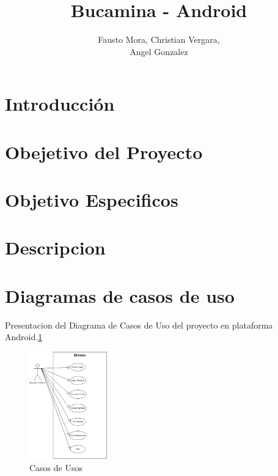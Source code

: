 \documentclass[11pt]{article} %
\title{Bucamina - Android}
\author{Fausto Mora, Christian Vergara, \\ Angel Gonzalez}
\begin{document}

\maketitle

\section{Introducción}
\newcommand{\oops}[1]{\textit{#1}}

\section{Obejetivo del Proyecto}
\section{Objetivo Especificos}
\section{Descripcion}
\section{Diagramas de casos de uso }

\begin{center}
Presentacion del Diagrama de Casos de Uso del proyecto en plataforma Android.\ref{fig:casosdeusos}

	\begin{figure}[h!]
  		\centering
    		\includegraphics[width=0.3\textwidth]{imagenes/casosdeusos.png}
  		\caption{Casos de Usos}
		\label{fig:casosdeusos}
	\end{figure}
\end{center}
\end{document}
